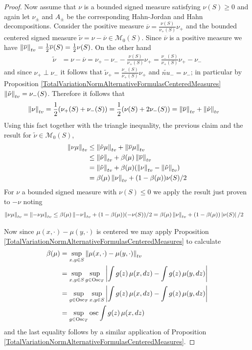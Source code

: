 \begin{proof}
Now assume that $\nu$ is a bounded signed measure satisfying $\nu(S) \geq 0$ and again let $\nu_\pm$ and $A_\pm$ be the corresponding Hahn-Jordan and Hahn decompositions.
Consider the positive measure $\overline{\nu} = \frac{\nu(S)}{\nu_+(S)} \nu_+$ and the bounded centered signed measure $\tilde{\nu} = \nu - \overline{\nu} \in \mathcal{M}_0(S)$.
Since $\overline{\nu}$ is a positive measure we have $\left \lVert  \overline{\nu} \right \rVert_{tv} = \frac{1}{2}\overline{\nu} (S) = \frac{1}{2}\nu(S)$.  On the other hand
\begin{align*}
\tilde{\nu} &= \nu - \overline{\nu} = \nu_+ - \nu_- - \frac{\nu(S)}{\nu_+(S)} \nu_+ = \frac{\nu_-(S)}{\nu_+(S)} \nu_+ - \nu_-
\end{align*}
and since $\nu_+ \perp \nu_-$ it follows that $\tilde{\nu}_+ = \frac{\nu_-(S)}{\nu_+(S)} \nu_+$ and $\tilde{nu}_- = \nu_-$; in particular by Proposition \ref{TotalVariationNormAlternativeFormulasCenteredMeasures} $\left \lVert  \tilde{\nu} \right \rVert_{tv} = \nu_-(S)$.  Therefore it follows that
\begin{align*}
\left \lVert  \nu \right \rVert_{tv} &= \frac{1}{2} ( \nu_+(S) + \nu_-(S)) = \frac{1}{2} ( \nu(S) + 2 \nu_-(S)) = \left \lVert  \overline{\nu} \right \rVert_{tv} + \left \lVert  \tilde{\nu} \right \rVert_{tv} 
\end{align*}
Using this fact together with the triangle inequality, the previous claim and the result for $\tilde{\nu} \in \mathcal{M}_0(S)$,
\begin{align*}
\left \lVert  \nu \mu \right \rVert_{tv} &\leq \left \lVert  \tilde{\nu} \mu \right \rVert_{tv} + \left \lVert  \overline{\nu} \mu \right \rVert_{tv} \\
&\leq \left \lVert  \tilde{\nu} \right \rVert_{tv} + \beta(\mu) \left \lVert  \overline{\nu} \right \rVert_{tv} \\
&= \left \lVert  \tilde{\nu} \right \rVert_{tv} + \beta(\mu) (\left \lVert  \nu \right \rVert_{tv} - \left \lVert  \tilde{\nu} \right \rVert_{tv}) \\
&= \beta(\mu) \left \lVert  \nu \right \rVert_{tv} + (1 - \beta(\mu)) \nu(S)/2 \\
\end{align*}
For $\nu$ a bounded signed measure with $\nu(S) \leq 0$ we apply the result just proven to $-\nu$  noting
\begin{align*}
\left \lVert  \nu \mu \right \rVert_{tv} &=\left \lVert  -\nu \mu \right \rVert_{tv} \leq \beta(\mu) \left \lVert  -\nu \right \rVert_{tv} + (1 - \beta(\mu)) (-\nu(S))/2  = \beta(\mu) \left \lVert  \nu \right \rVert_{tv} + (1 - \beta(\mu)) \left \vert \nu(S) \right \vert/2
\end{align*}

Now since $\mu(x, \cdot) - \mu(y, \cdot)$ is centered we may apply Proposition \ref{TotalVariationNormAlternativeFormulasCenteredMeasures} to calculate
\begin{align*}
\beta(\mu) &= \sup_{x,y \in S} \left \lVert  \mu(x, \cdot) - \mu(y, \cdot) \right \rVert_{tv} \\
&= \sup_{x,y \in S}\sup_{g \in \operatorname*{Osc}_{T}} \left \vert \int g(z) \, \mu(x, dz)  - \int g(z) \, \mu(y, dz) \right \vert \\
&= \sup_{g \in \operatorname*{Osc}_{T}} \sup_{x,y \in S} \left \vert \int g(z) \, \mu(x, dz)  - \int g(z) \, \mu(y, dz) \right \vert \\
&= \sup_{g \in \operatorname*{Osc}_{T}} \operatorname*{osc}{\int g(z) \, \mu(x, dz)} \\
\end{align*}
and the last equality follows by a similar application of Proposition \ref{TotalVariationNormAlternativeFormulasCenteredMeasures}.
\end{proof}

